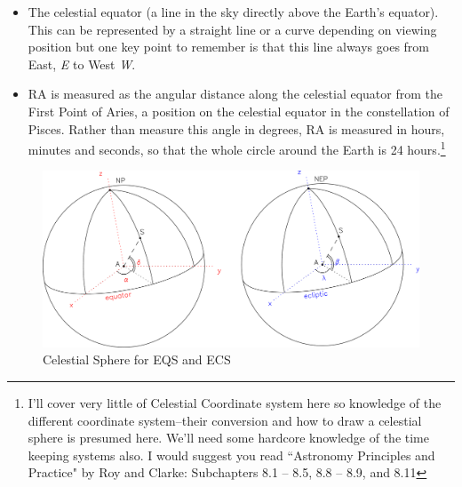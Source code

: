 \documentclass[a4paper,12pt]{extarticle}
\begin{document}
\begin{itemize}
    \item The celestial equator (a line in the sky directly above the Earth’s equator). This can be represented by a straight line or a curve depending on viewing position but one key point to remember is that this line always goes from East, \textit{E} to West\textit{ W}.
    \item RA is measured as the angular distance along the celestial equator from the First Point of Aries, a position on the celestial equator in the constellation of Pisces. Rather than measure this angle in degrees, RA is measured in hours, minutes and seconds, so that the whole circle around the Earth is 24 hours.\footnote{I'll cover very little of Celestial Coordinate system here so knowledge of the different coordinate system--their conversion and how to draw a celestial sphere is presumed here. We'll need some hardcore knowledge of the time keeping systems also. I would suggest you read ``Astronomy Principles and Practice" by Roy and Clarke: Subchapters 8.1 – 8.5, 8.8 – 8.9, and 8.11}
\end{itemize}
    \begin{figure}[H]
	\centering
	\includegraphics[width=\linewidth]{cel.png}
	\caption{Celestial Sphere for EQS and ECS}
\end{figure}
\end{document}
